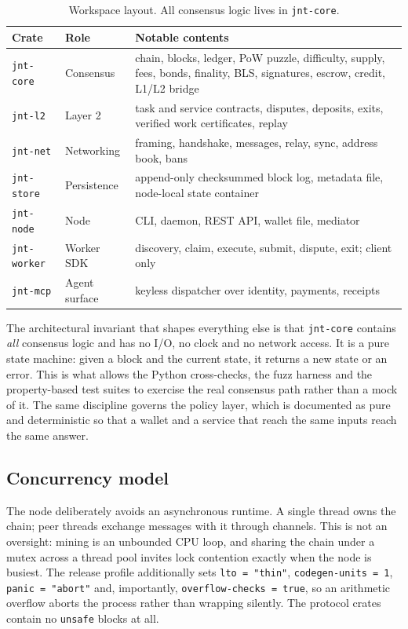 \documentclass{article}
\begin{document}
\begin{table}[t]
\centering
\begin{tabular}{p{}p{}p{}}
\toprule
\textbf{Crate} & \textbf{Role} & \textbf{Notable contents} \\
\midrule
\texttt{jnt-core} & Consensus & chain, blocks, ledger, PoW puzzle, difficulty,
  supply, fees, bonds, finality, BLS, signatures, escrow, credit, L1/L2 bridge \\
\texttt{jnt-l2} & Layer 2 & task and service contracts, disputes, deposits,
  exits, verified work certificates, replay \\
\texttt{jnt-net} & Networking & framing, handshake, messages, relay, sync,
  address book, bans \\
\texttt{jnt-store} & Persistence & append-only checksummed block log, metadata
  file, node-local state container \\
\texttt{jnt-node} & Node & CLI, daemon, REST API, wallet file, mediator \\
\texttt{jnt-worker} & Worker SDK & discovery, claim, execute, submit, dispute,
  exit; client only \\
\texttt{jnt-mcp} & Agent surface & keyless dispatcher over identity, payments,
  receipts \\
\bottomrule
\end{tabular}
\caption{Workspace layout. All consensus logic lives in \texttt{jnt-core}.}
\label{tab:crates}
\end{table}

The architectural invariant that shapes everything else is that
\texttt{jnt-core} contains \emph{all} consensus logic and has no I/O, no clock
and no network access. It is a pure state machine: given a block and the
current state, it returns a new state or an error. This is what allows the
Python cross-checks, the fuzz harness and the property-based test suites to
exercise the real consensus path rather than a mock of it. The same discipline
governs the policy layer, which is documented as pure and deterministic so that
a wallet and a service that reach the same inputs reach the same answer.

\subsection{Concurrency model}

The node deliberately avoids an asynchronous runtime. A single thread owns the
chain; peer threads exchange messages with it through channels. This is not an
oversight: mining is an unbounded CPU loop, and sharing the chain under a mutex
across a thread pool invites lock contention exactly when the node is busiest.
The release profile additionally sets \texttt{lto = "thin"},
\texttt{codegen-units = 1}, \texttt{panic = "abort"} and, importantly,
\texttt{overflow-checks = true}, so an arithmetic overflow aborts the process
rather than wrapping silently. The protocol crates contain no \texttt{unsafe}
blocks at all.
\end{document}

